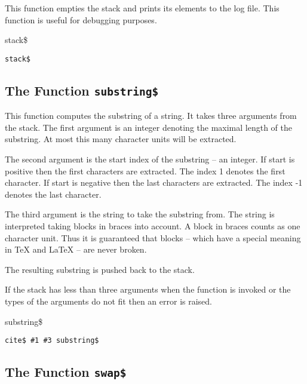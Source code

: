This function empties the stack and prints its elements to the log
file. This function is useful for debugging purposes.

\begin{BstFunction}{stack\$}
\end{BstFunction}

\begin{lstlisting}[language=bst]
  stack$
\end{lstlisting}


\subsection{The Function \texttt{substring\$}}%

This function computes the substring of a string. It takes three
arguments from the stack. The first argument is an integer denoting
the maximal length of the substring. At most this many character units
will be extracted.

The second argument is the start index of the substring -- an integer.
If start is positive then the first characters are extracted.  The
index 1 denotes the first character. If start is negative then the
last characters are extracted.  The index -1 denotes the last
character.

The third argument is the string to take the substring from. The
string is interpreted taking blocks in braces into account. A block in
braces counts as one character unit. Thus it is guaranteed that blocks
-- which have a special meaning in \TeX{} and
\LaTeX{} -- are never broken.

The resulting substring is pushed back to the stack.

If the stack has less than three arguments when the function is
invoked or the types of the arguments do not fit then an error is
raised.

\begin{BstFunction}{substring\$}
\end{BstFunction}

\begin{lstlisting}[language=bst]
  cite$ #1 #3 substring$
\end{lstlisting}

\subsection{The Function \texttt{swap\$}}%

